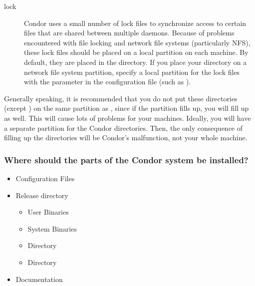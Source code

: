 \begin{description}
\item[lock] Condor uses a small number of lock files to synchronize
access to certain files that are shared between multiple daemons.
Because of problems encountered with file locking and network
file systems (particularly NFS), these lock files should be placed on a
local partition on each machine.  By default, they are placed in
the  directory.  If you place your 
directory on a network file system partition,
specify a local partition for the
lock files with the  parameter in the configuration file (such as
).

\end{description}

Generally speaking, it is recommended that you do not put these directories
(except ) on the same partition as ,
since if the partition
fills up, you will fill up  as well. 
This will cause lots of
problems for your machines.  Ideally, you will have a separate partition
for the Condor directories. Then, the only consequence of filling up
the directories
will be Condor's malfunction, not your whole machine.

\subsubsection{Where should the parts of the Condor system be
installed?} 

	\begin{itemize}
	\item Configuration Files
	\item Release directory
		\begin{itemize}
		\item User Binaries
		\item System Binaries 
		\item {} Directory
	  	\item {} Directory
		\end{itemize}
	\item Documentation
	\end{itemize}


